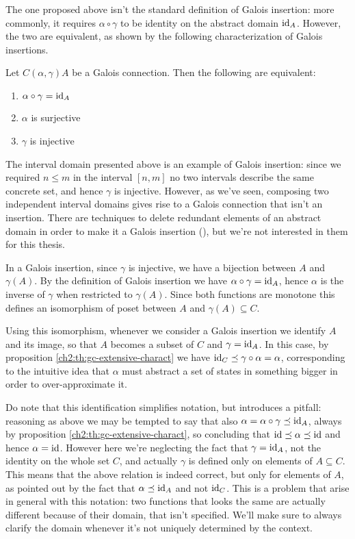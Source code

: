 The one proposed above isn't the standard definition of Galois insertion: more commonly, it requires $\alpha \circ \gamma$ to be identity on the abstract domain $\text{id}_A$. However, the two are equivalent, as shown by the following characterization of Galois insertions.
\begin{prop}\label{ch2:th:gi-charact}
	Let $C (\alpha, \gamma) A$ be a Galois connection. Then the following are equivalent:
	\begin{enumerate}[label={(\arabic*)}]
		\item $\alpha \circ \gamma = \text{id}_A$
		\item $\alpha$ is surjective
		\item $\gamma$ is injective
	\end{enumerate}
\end{prop}

The interval domain presented above is an example of Galois insertion: since we required $n \le m$ in the interval $[n, m]$ no two intervals describe the same concrete set, and hence $\gamma$ is injective. However, as we've seen, composing two independent interval domains gives rise to a Galois connection that isn't an insertion. There are techniques to delete redundant elements of an abstract domain in order to make it a Galois insertion (), but we're not interested in them for this thesis.

In a Galois insertion, since $\gamma$ is injective, we have a bijection between $A$ and $\gamma(A)$. By the definition of Galois insertion we have $\alpha \circ \gamma = \text{id}_A$, hence $\alpha$ is the inverse of $\gamma$ when restricted to $\gamma(A)$. Since both functions are monotone this defines an isomorphism of poset between $A$ and $\gamma(A) \subseteq C$.

Using this isomorphism, whenever we consider a Galois insertion we identify $A$ and its image, so that $A$ becomes a subset of $C$ and $\gamma = \text{id}_A$. In this case, by proposition \ref{ch2:th:gc-extensive-charact} we have $\text{id}_C \preceq \gamma \circ \alpha = \alpha$, corresponding to the intuitive idea that $\alpha$ must abstract a set of states in something bigger in order to over-approximate it.

Do note that this identification simplifies notation, but introduces a pitfall: reasoning as above we may be tempted to say that also $\alpha = \alpha \circ \gamma \preceq \text{id}_A$, always by proposition \ref{ch2:th:gc-extensive-charact}, so concluding that $\text{id} \preceq \alpha \preceq \text{id}$ and hence $\alpha = \text{id}$. However here we're neglecting the fact that $\gamma = \text{id}_A$, not the identity on the whole set $C$, and actually $\gamma$ is defined only on elements of $A \subseteq C$. This means that the above relation is indeed correct, but only for elements of $A$, as pointed out by the fact that $\alpha \preceq \text{id}_A$ and not $\text{id}_C$. This is a problem that arise in general with this notation: two functions that looks the same are actually different because of their domain, that isn't specified. We'll make sure to always clarify the domain whenever it's not uniquely determined by the context.

